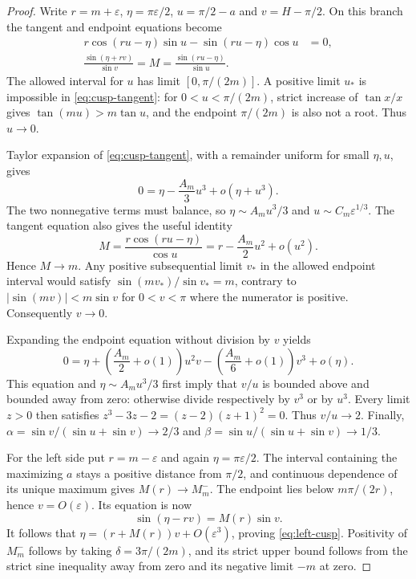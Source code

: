 \begin{proof}
Write $r=m+\varepsilon$, $\eta=\pi\varepsilon/2$,
$u=\pi/2-a$ and $v=H-\pi/2$. On this branch the tangent and endpoint
equations become
\begin{align}
 r\cos(ru-\eta)\sin u-\sin(ru-\eta)\cos u&=0,
                                                       \label{eq:cusp-tangent}\\
 \frac{\sin(\eta+rv)}{\sin v}=M
     =\frac{\sin(ru-\eta)}{\sin u}.       \label{eq:cusp-endpoint}
\end{align}
The allowed interval for $u$ has limit $[0,\pi/(2m)]$.
A positive limit $u_*$ is impossible in \eqref{eq:cusp-tangent}:
for $0<u<\pi/(2m)$, strict increase of $\tan x/x$ gives
$\tan(mu)>m\tan u$, and the endpoint $\pi/(2m)$ is also not a root.
Thus $u\to0$.

Taylor expansion of \eqref{eq:cusp-tangent}, with a remainder uniform
for small $\eta,u$, gives
\[
 0=\eta-\frac{A_m}{3}u^3+o(\eta+u^3).
\]
The two nonnegative terms must balance, so
$\eta\sim A_mu^3/3$ and $u\sim C_m\varepsilon^{1/3}$.
The tangent equation also gives the useful identity
\[
 M=\frac{r\cos(ru-\eta)}{\cos u}
   =r-\frac{A_m}{2}u^2+o(u^2).
\]
Hence $M\to m$. Any positive subsequential limit $v_*$ in the allowed
endpoint interval would satisfy
$\sin(mv_*)/\sin v_*=m$, contrary to
$|\sin(mv)|<m\sin v$ for $0<v<\pi$ where the numerator is positive.
Consequently $v\to0$.

Expanding the endpoint equation without division by $v$ yields
\[
 0=\eta+\left(\frac{A_m}{2}+o(1)\right)u^2v
            -\left(\frac{A_m}{6}+o(1)\right)v^3
            +o(\eta).
\]
This equation and $\eta\sim A_mu^3/3$ first imply that $v/u$ is bounded
above and bounded away from zero: otherwise divide respectively by
$v^3$ or by $u^3$. Every limit $z>0$ then satisfies
$z^3-3z-2=(z-2)(z+1)^2=0$. Thus $v/u\to2$.
Finally,
$\alpha=\sin v/(\sin u+\sin v)\to2/3$ and
$\beta=\sin u/(\sin u+\sin v)\to1/3$.

For the left side put $r=m-\varepsilon$ and again $\eta=\pi\varepsilon/2$.
The interval containing the maximizing $a$ stays a positive distance
from $\pi/2$, and continuous dependence of its unique maximum gives
$M(r)\to M_m^-$. The endpoint lies below $m\pi/(2r)$, hence
$v=O(\varepsilon)$. Its equation is now
\[
 \sin(\eta-rv)=M(r)\sin v.
\]
It follows that $\eta=(r+M(r))v+O(\varepsilon^3)$, proving
\eqref{eq:left-cusp}. Positivity of $M_m^-$ follows by taking
$\delta=3\pi/(2m)$, and its strict upper bound follows from the strict
sine inequality away from zero and its negative limit $-m$ at zero.
\end{proof}

